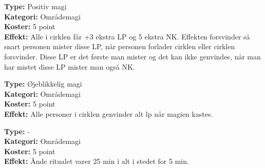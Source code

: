 \begin{ritual*}
\textbf{Type:} Positiv magi\\
\textbf{Kategori:} Områdemagi\\
\textbf{Koster:} 5 point\\
\textbf{Effekt:} Alle i cirklen får +3 ekstra LP og 5 ekstra NK. 
Effekten forsvinder så snart personen mister disse LP, når personen forlader cirklen eller cirklen forsvinder. Disse LP er det første man mister og det kan ikke genvindes, når man har mistet disse LP mister man også NK.
\end{ritual*}

\begin{ritual*}[Helbredelse 3]
\textbf{Type:} Øjeblikkelig magi\\
\textbf{Kategori:} Områdemagi\\
\textbf{Koster:} 5 point\\
\textbf{Effekt:} Alle personer i cirklen genvinder alt lp når magien kastes.
\end{ritual*}

\begin{ritual*}
\textbf{Type:} -\\
\textbf{Kategori:} Områdemagi\\
\textbf{Koster:} 5 point\\
\textbf{Effekt:} Ånde ritualet varer 25 min i alt i stedet for 5 min.
\end{ritual*}